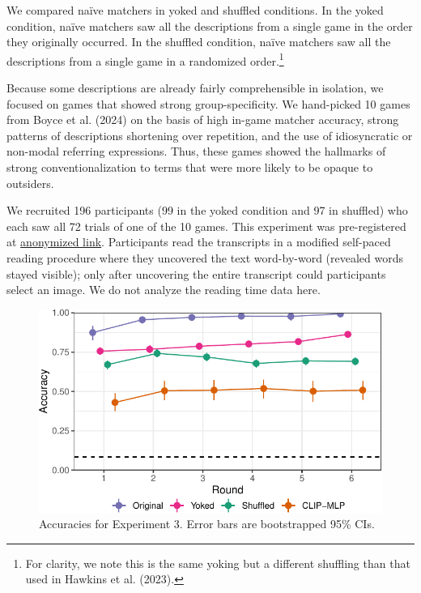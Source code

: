 \documentclass[10pt, letterpaper]{article}
\begin{document}
We compared naïve matchers in yoked and shuffled conditions. In the
yoked condition, naïve matchers saw all the descriptions from a single
game in the order they originally occurred. In the shuffled condition,
naïve matchers saw all the descriptions from a single game in a
randomized order.\footnote{For clarity, we note this is the same yoking
  but a different shuffling than that used in Hawkins et al. (2023).}

Because some descriptions are already fairly comprehensible in
isolation, we focused on games that showed strong group-specificity. We
hand-picked 10 games from Boyce et al. (2024) on the basis of high
in-game matcher accuracy, strong patterns of descriptions shortening
over repetition, and the use of idiosyncratic or non-modal referring
expressions. Thus, these games showed the hallmarks of strong
conventionalization to terms that were more likely to be opaque to
outsiders.

We recruited 196 participants (99 in the yoked condition and 97 in
shuffled) who each saw all 72 trials of one of the 10 games. This
experiment was pre-registered at
\href{https://osf.io/zqwp5/?view_only=87420dc86f0a4a56a395cd464aa3a5c1}{anonymized
link}. Participants read the transcripts in a modified self-paced
reading procedure where they uncovered the text word-by-word (revealed
words stayed visible); only after uncovering the entire transcript could
participants select an image. We do not analyze the reading time data
here.

\begin{CodeChunk}
\begin{figure}[t]

{\centering \includegraphics[width=0.9\linewidth]{figs/fig-yoked-1} 

}

\caption[Accuracies for Experiment 3]{Accuracies for Experiment 3. Error bars are bootstrapped 95\% CIs. \label{yoked}}\label{fig:fig-yoked}
\end{figure}
\end{CodeChunk}
\end{document}
